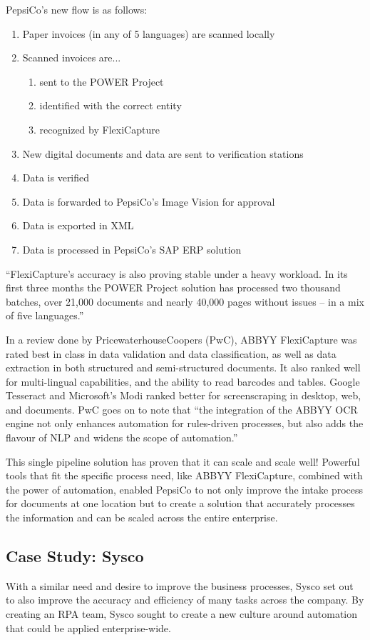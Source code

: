 \documentclass[conference]{IEEEtran}
\begin{document}
PepsiCo's new flow is as follows:
\begin{enumerate}
\item Paper invoices (in any of 5 languages) are scanned locally
\item Scanned invoices are...
    \begin{enumerate}
        \item sent to the POWER Project
        \item identified with the correct entity
        \item recognized by FlexiCapture
    \end{enumerate}
\item New digital documents and data are sent to verification stations
\item Data is verified
\item Data is forwarded to PepsiCo's Image Vision for approval
\item Data is exported in XML
\item Data is processed in PepsiCo's SAP ERP solution
\end{enumerate}

``FlexiCapture's accuracy is also proving stable under a heavy workload. In its first three months the POWER Project solution has processed two thousand batches, over 21,000 documents and nearly 40,000 pages without issues – in a mix of five languages.'' \cite{pepsico}

In a review done by PricewaterhouseCoopers (PwC), ABBYY FlexiCapture was rated best in class in data validation and data classification, as well as data extraction in both structured and semi-structured documents. It also ranked well for multi-lingual capabilities, and the ability to read barcodes and tables. Google Tesseract and Microsoft's Modi ranked better for screenscraping in desktop, web, and documents. PwC goes on to note that ``the integration of the ABBYY OCR engine not only enhances automation for rules-driven processes, but also adds the flavour of NLP and widens the scope of automation.'' \cite{pwc2018robotic}

This single pipeline solution has proven that it can scale and scale well! Powerful tools that fit the specific process need, like ABBYY FlexiCapture, combined with the power of automation, enabled PepsiCo to not only improve the intake process for documents at one location but to create a solution that accurately processes the information and can be scaled across the entire enterprise.

\subsection{Case Study: Sysco}
With a similar need and desire to improve the business processes, Sysco set out to also improve the accuracy and efficiency of many tasks across the company. By creating an RPA team, Sysco sought to create a new culture around automation that could be applied enterprise-wide.
\end{document}
